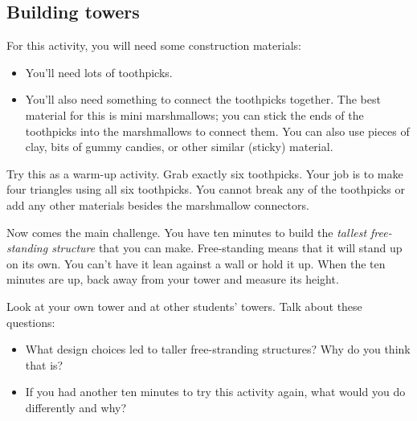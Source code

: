 \newpage





\subsection{Building towers}
For this activity, you will need some construction materials:
\begin{itemize}
\item
You'll need lots of toothpicks.\\

\item
You'll also need something to connect the toothpicks together.  The best material for this is mini marshmallows; you can stick the ends of the toothpicks into the marshmallows to connect them.  You can also use pieces of clay, bits of gummy candies, or other similar (sticky) material.\\
\end{itemize}

\bigskip

\begin{problem}
Try this as a warm-up activity.  Grab exactly six toothpicks.  Your job is to make four triangles using all six toothpicks.  You cannot break any of the toothpicks or add any other materials besides the marshmallow connectors.
\end{problem}

\bigskip

\begin{problem}
Now comes the main challenge.  You have ten minutes to build the \emph{tallest free-standing structure} that you can make.  
Free-standing means that it will stand up on its own.  You can't have it lean against a wall or hold it up.  When the ten minutes are up, back away from your tower and measure its height.  
\end{problem}

\bigskip
\bigskip

\begin{thinkpair*}
Look at your own tower and at other students' towers.  Talk about these questions: 
\begin{itemize}
\item
What design choices led to taller free-stranding structures?  Why do you think that is?\\
\item
If you had another ten minutes to try this activity again, what would you do differently and why?\\
\end{itemize}

\end{thinkpair*}

